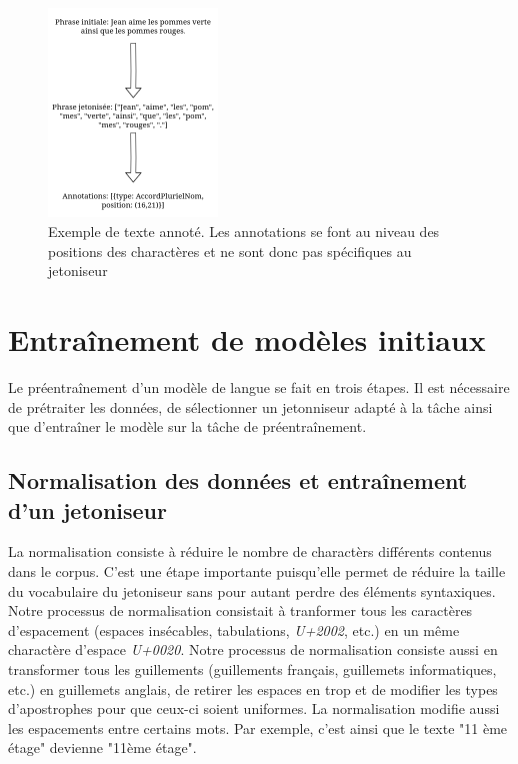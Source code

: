 \documentclass[12pt,twoside,maitrise]{dms}
\theoremstyle{definition}
\numberwithin{equation}{section}
\numberwithin{table}{chapter}
\numberwithin{figure}{chapter}
\begin{document}
\begin{figure}
	\begin{center}
		\includegraphics[width=0.4\textwidth]{figures/annotation.png}
	\end{center}
	\caption{Exemple de texte annoté. Les annotations se font au niveau des positions des charactères et ne sont donc pas spécifiques au jetoniseur}
	\label{fig:ex_annotation}
\end{figure}


\chapter{Entraînement de modèles initiaux}
Le préentraînement d'un modèle de langue se fait en trois étapes. Il est
nécessaire de prétraiter les données, de sélectionner un jetonniseur adapté à
la tâche ainsi que d'entraîner le modèle sur la tâche de préentraînement.

\section{Normalisation des données et entraînement d'un jetoniseur}
La normalisation consiste à réduire le nombre de charactèrs différents contenus
dans le corpus. C'est une étape importante puisqu'elle permet de réduire la
taille du vocabulaire du jetoniseur sans pour autant perdre des éléments
syntaxiques. Notre processus de normalisation consistait à tranformer tous les
caractères d'espacement (espaces insécables, tabulations, \textit{U+2002},
etc.) en un même charactère d'espace \textit{U+0020}. Notre processus de
normalisation consiste aussi en transformer tous les guillements (guillements
français, guillemets informatiques, etc.) en guillemets anglais, de retirer les
espaces en trop et de modifier les types d'apostrophes pour que ceux-ci soient
uniformes. La normalisation modifie aussi les espacements entre certains mots.
Par exemple, c'est ainsi que le texte "11 ème étage" devienne "11ème étage".\\
\end{document}
